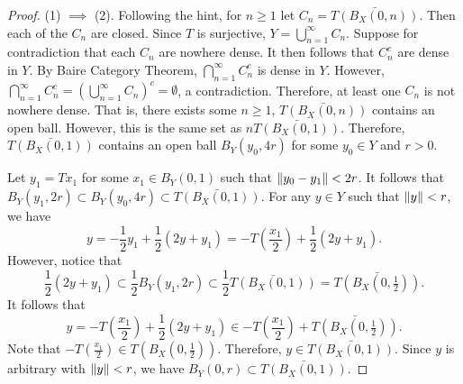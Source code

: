 \documentclass[a4paper]{article}
\begin{document}
\begin{proof}
  (1) $\implies$ (2). Following the hint, for $n \geq 1$ let
  $C_n = \bar{T(B_X(0, n))}$. Then each of the $C_n$ are closed.
  Since $T$ is surjective, $Y = \bigcup_{n=1}^\infty C_n$.
  Suppose for contradiction that each $C_n$ are nowhere dense.
  It then follows that $C_n^c$ are dense in $Y$. By Baire Category
  Theorem, $\bigcap_{n=1}^\infty C_n^c$ is dense in $Y$. However,
  $\bigcap_{n=1}^\infty C_n^c = \left( \bigcup_{n=1}^\infty C_n \right)^c
  = \emptyset$, a contradiction. Therefore, at least one $C_n$
  is not nowhere dense. That is, there exists some $n \geq 1$,
  $\bar{T(B_X(0, n))}$ contains an open ball. However,
  this is the same set as $n \bar{T(B_X(0, 1))}$. Therefore,
  $\bar{T(B_X(0, 1))}$ contains an open ball $B_Y(y_0, 4 r)$
  for some $y_0 \in Y$ and $r > 0$.

  Let $y_1 = T x_1$ for some $x_1 \in B_Y(0,1)$ such that
  $\left\lVert y_0 - y_1\right\rVert < 2 r$. It follows that
  $B_Y(y_1, 2 r) \subset B_Y(y_0, 4 r) \subset \bar{T(B_X(0,1))}$.
  For any $y \in Y$ such that
  $\left\lVert y\right\rVert < r$, we have
  \[
  y = -\frac{1}{2} y_1 + \frac{1}{2} (2 y + y_1) =
  - T \left( \frac{x_1}{2} \right) + \frac{1}{2} (2 y + y_1).
  \]
  However, notice that
  \[
  \frac{1}{2} (2 y + y_1) \subset \frac{1}{2} B_Y(y_1, 2r)
  \subset \frac{1}{2} \bar{T(B_X(0, 1))}
  = \bar{T(B_X(0, \tfrac{1}{2}))} .
  \]
  It follows that
  \[
  y = - T \left( \frac{x_1}{2} \right) + \frac{1}{2} (2 y + y_1)
  \in - T \left( \frac{x_1}{2} \right) + \bar{T(B_X(0, \tfrac{1}{2}))}.
  \]
  Note that $- T(\frac{x_1}{2}) \in T(B_X(0, \frac{1}{2}))$. Therefore,
  $y \in \bar{T(B_X(0, 1))}$. Since $y$ is arbitrary with
  $\left\lVert y\right\rVert < r$, we have $B_Y(0, r) \subset \bar{T(B_X(0,1))}$.


\end{proof}
\end{document}
